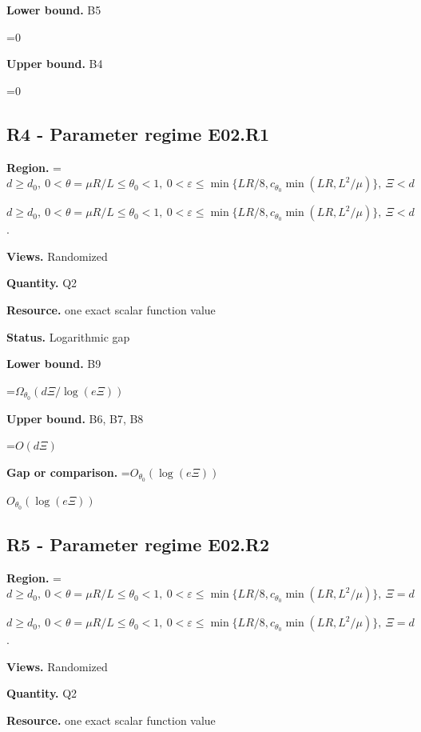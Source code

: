 \documentclass[10pt,a4paper]{article}
\newcommand{\AtlasMath}[1]{\par\begingroup\centering\setbox0=\hbox{$\displaystyle #1$}\ifdim\wd0>1.4\linewidth\typeout{ATLAS WIDE FORMULA: \the\wd0}\fi\ifdim\wd0>\linewidth\resizebox{\linewidth}{!}{\box0}\else\box0\fi\par\endgroup}
\newcommand{\AtlasInlineMath}[1]{\begingroup\setbox0=\hbox{$#1$}\ifdim\wd0>.4\linewidth\endgroup\AtlasMath{#1}\else\endgroup$#1$\fi}
\begin{document}
\textbf{Lower bound.} B5



\AtlasMath{0}


\textbf{Upper bound.} B4



\AtlasMath{0}


\subsection{R4 - Parameter regime E02.R1}


\textbf{Region.} \AtlasInlineMath{d\ge d_0,\ 0<\theta=\mu R/L\le\theta_0<1,\ 0<\varepsilon\le\min\{LR/8,c_{\theta_0}\min(LR,L^2/\mu)\},\ \Xi<d}.



\textbf{Views.} Randomized



\textbf{Quantity.} Q2



\textbf{Resource.} one exact scalar function value



\textbf{Status.} Logarithmic gap



\textbf{Lower bound.} B9



\AtlasMath{\Omega_{\theta_0}(d\Xi/\log(e\Xi))}


\textbf{Upper bound.} B6, B7, B8



\AtlasMath{O(d\Xi)}


\textbf{Gap or comparison.} \AtlasInlineMath{O_{\theta_0}(\log(e\Xi))}



\subsection{R5 - Parameter regime E02.R2}


\textbf{Region.} \AtlasInlineMath{d\ge d_0,\ 0<\theta=\mu R/L\le\theta_0<1,\ 0<\varepsilon\le\min\{LR/8,c_{\theta_0}\min(LR,L^2/\mu)\},\ \Xi=d}.



\textbf{Views.} Randomized



\textbf{Quantity.} Q2



\textbf{Resource.} one exact scalar function value
\end{document}
